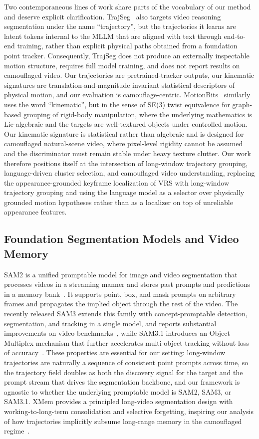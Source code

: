 \documentclass[11pt]{article}
\begin{document}
Two contemporaneous lines of work share parts of the vocabulary of our method and deserve explicit clarification.
TrajSeg~\cite{trajseg} also targets video reasoning segmentation under the name ``trajectory'', but the trajectories it learns are latent tokens internal to the MLLM that are aligned with text through end-to-end training, rather than explicit physical paths obtained from a foundation point tracker.
Consequently, TrajSeg does not produce an externally inspectable motion structure, requires full model training, and does not report results on camouflaged video.
Our trajectories are pretrained-tracker outputs, our kinematic signatures are translation-and-magnitude invariant statistical descriptors of physical motion, and our evaluation is camouflage-centric.
MotionBits~\cite{motionbits} similarly uses the word ``kinematic'', but in the sense of SE(3) twist equivalence for graph-based grouping of rigid-body manipulation, where the underlying mathematics is Lie-algebraic and the targets are well-textured objects under controlled motion.
Our kinematic signature is statistical rather than algebraic and is designed for camouflaged natural-scene video, where pixel-level rigidity cannot be assumed and the discriminator must remain stable under heavy texture clutter.
Our work therefore positions itself at the intersection of long-window trajectory grouping, language-driven cluster selection, and camouflaged video understanding, replacing the appearance-grounded keyframe localization of VRS with long-window trajectory grouping and using the language model as a selector over physically grounded motion hypotheses rather than as a localizer on top of unreliable appearance features.

\subsection{Foundation Segmentation Models and Video Memory}
SAM2 is a unified promptable model for image and video segmentation that processes videos in a streaming manner and stores past prompts and predictions in a memory bank~\cite{sam2}.
It supports point, box, and mask prompts on arbitrary frames and propagates the implied object through the rest of the video.
The recently released SAM3 extends this family with concept-promptable detection, segmentation, and tracking in a single model, and reports substantial improvements on video benchmarks~\cite{sam3}, while SAM3.1 introduces an Object Multiplex mechanism that further accelerates multi-object tracking without loss of accuracy~\cite{sam3p1}.
These properties are essential for our setting: long-window trajectories are naturally a sequence of consistent point prompts across time, so the trajectory field doubles as both the discovery signal for the target and the prompt stream that drives the segmentation backbone, and our framework is agnostic to whether the underlying promptable model is SAM2, SAM3, or SAM3.1.
XMem provides a principled long-video segmentation design with working-to-long-term consolidation and selective forgetting, inspiring our analysis of how trajectories implicitly subsume long-range memory in the camouflaged regime~\cite{xmem}.
\end{document}
